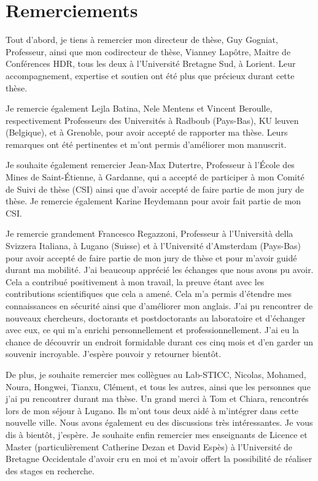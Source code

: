 \chapter*{Remerciements}

Tout d'abord, je tiens à remercier mon directeur de thèse, Guy Gogniat, Professeur, ainsi que mon codirecteur de thèse, Vianney Lapôtre, Maitre de Conférences HDR, tous les deux à l'Université Bretagne Sud, à Lorient. Leur accompagnement, expertise et soutien ont été plus que précieux durant cette thèse.

Je remercie également Lejla Batina, Nele Mentens et Vincent Beroulle, respectivement Professeurs des Universités à Radboub (Pays-Bas), KU leuven (Belgique), et à Grenoble, pour avoir accepté de rapporter ma thèse. Leurs remarques ont été pertinentes et m'ont permis d'améliorer mon manuscrit.

Je souhaite également remercier Jean-Max Dutertre, Professeur à l'\'Ecole des Mines de Saint-\'Etienne, à Gardanne, qui a accepté de participer à mon Comité de Suivi de thèse (CSI) ainsi que d'avoir accepté de faire partie de mon jury de thèse. Je remercie également Karine Heydemann pour avoir fait partie de mon CSI.

Je remercie grandement Francesco Regazzoni, Professeur à l'Università della Svizzera Italiana, à Lugano (Suisse) et à l'Université d'Amsterdam (Pays-Bas) pour avoir accepté de faire partie de mon jury de thèse et pour m'avoir guidé durant ma mobilité. J'ai beaucoup apprécié les échanges que nous avons pu avoir. Cela a contribué positivement à mon travail, la preuve étant avec les contributions scientifiques que cela a amené. Cela m'a permis d'étendre mes connaissances en sécurité ainsi que d'améliorer mon anglais. J'ai pu rencontrer de nouveaux chercheurs, doctorants et postdoctorants au laboratoire et d'échanger avec eux, ce qui m'a enrichi personnellement et professionnellement. J'ai eu la chance de découvrir un endroit formidable durant ces cinq mois et d'en garder un souvenir incroyable. J'espère pouvoir y retourner bientôt.

De plus, je souhaite remercier mes collègues au Lab-STICC, Nicolas, Mohamed, Noura, Hongwei, Tianxu, Clément, et tous les autres, ainsi que les personnes que j'ai pu rencontrer durant ma thèse. Un grand merci à Tom et Chiara, rencontrés lors de mon séjour à Lugano. Ils m'ont tous deux aidé à m'intégrer dans cette nouvelle ville. Nous avons également eu des discussions très intéressantes. Je vous dis à bientôt, j'espère. Je souhaite enfin remercier mes enseignants de Licence et Master (particulièrement Catherine Dezan et David Espès) à l'Université de Bretagne Occidentale d'avoir cru en moi et m'avoir offert la possibilité de réaliser des stages en recherche.

